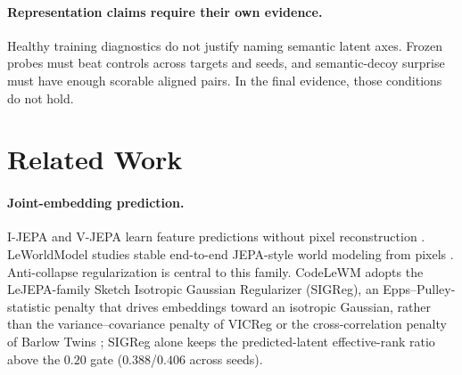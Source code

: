 \documentclass[11pt]{article}
\newcommand{\modelname}{CodeLeWM}
\begin{document}
\paragraph{Representation claims require their own evidence.}
Healthy training diagnostics do not justify naming semantic latent axes.
Frozen probes must beat controls across targets and seeds, and semantic-decoy
surprise must have enough scorable aligned pairs. In the final evidence, those
conditions do not hold.

\section{Related Work}

\paragraph{Joint-embedding prediction.}
I-JEPA and V-JEPA learn feature predictions without pixel reconstruction
\citep{assran2023selfsupervisedlearningimagesjointembedding,bardes2024revisitingfeaturepredictionlearning}.
LeWorldModel studies stable end-to-end JEPA-style world modeling from pixels
\citep{maes2026leworldmodelstableendtoendjointembedding}. Anti-collapse
regularization is central to this family. \modelname{} adopts the LeJEPA-family
Sketch Isotropic Gaussian Regularizer (SIGReg), an Epps--Pulley-statistic penalty
that drives embeddings toward an isotropic Gaussian, rather than the
variance--covariance penalty of VICReg or the cross-correlation penalty of Barlow
Twins
\citep{bardes2022vicregvarianceinvariancecovarianceregularizationselfsupervised,zbontar2021barlowtwinsselfsupervisedlearning,balestriero2025lejepaprovablescalableselfsupervised};
SIGReg alone keeps the predicted-latent effective-rank ratio above the $0.20$
gate ($0.388$/$0.406$ across seeds).
\end{document}
